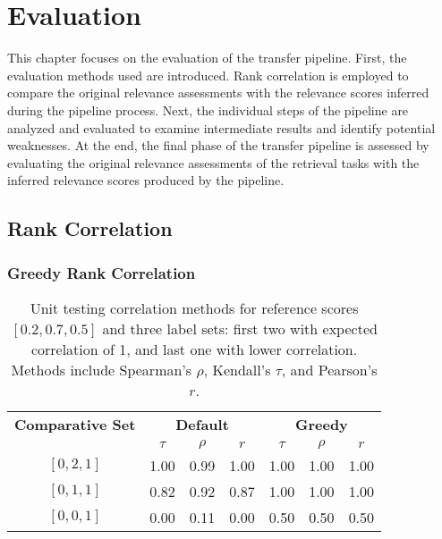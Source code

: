 \chapter{Evaluation}\label{evaluation}

This chapter focuses on the evaluation of the transfer pipeline. First, the evaluation methods used are introduced. Rank correlation is employed to compare the original relevance assessments with the relevance scores inferred during the pipeline process. Next, the individual steps of the pipeline are analyzed and evaluated to examine intermediate results and identify potential weaknesses. At the end, the final phase of the transfer pipeline is assessed by evaluating the original relevance assessments of the retrieval tasks with the inferred relevance scores produced by the pipeline.

\section{Rank Correlation}\label{rank-correlation}

\subsection{Greedy Rank Correlation}\label{greedy-rank-correlation}

\begin{table}[t]
    \centering
    \caption{
        Unit testing correlation methods for reference scores $[0.2, 0.7, 0.5]$ and three label sets: first two with expected correlation of 1, and last one with lower correlation. Methods include Spearman's $\rho$, Kendall's $\tau$, and Pearson's $r$.
    }
    \begin{tabular}{ccccccc}
        \toprule
        \textbf{Comparative Set} & \multicolumn{3}{c}{\textbf{Default}} & \multicolumn{3}{c}{\textbf{Greedy}} \\
        \cmidrule(lr){2-4} \cmidrule(lr){5-7}
                                 & $\tau$ & $\rho$ & $r$ & $\tau$ & $\rho$ & $r$ \\
        \midrule
        
        $[0, 2, 1]$ & 1.00 & 0.99 & 1.00 & 1.00  & 1.00  & 1.00 \\
        $[0, 1, 1]$ & 0.82 & 0.92 & 0.87 & 1.00  & 1.00  & 1.00 \\
        $[0, 0, 1]$ & 0.00 & 0.11 & 0.00 & 0.50  & 0.50  & 0.50 \\
        \bottomrule
    \end{tabular}
\end{table}

